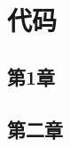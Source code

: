 \documentclass{standalone}
\begin{document}
\thesisappendix
\section{代码}
\subsection{第1章}
\subsection{第二章}
\end{document}
